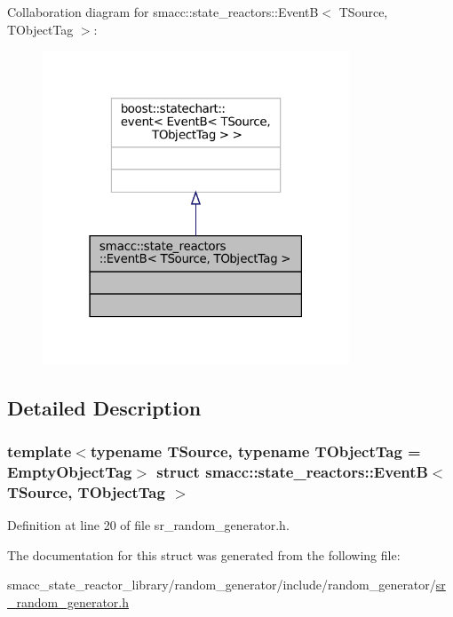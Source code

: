 Collaboration diagram for smacc\+:\+:state\+\_\+reactors\+:\+:EventB$<$ T\+Source, T\+Object\+Tag $>$\+:
\nopagebreak
\begin{figure}[H]
\begin{center}
\leavevmode
\includegraphics[width=259pt]{structsmacc_1_1state__reactors_1_1EventB__coll__graph}
\end{center}
\end{figure}


\subsection{Detailed Description}
\subsubsection*{template$<$typename T\+Source, typename T\+Object\+Tag = Empty\+Object\+Tag$>$\newline
struct smacc\+::state\+\_\+reactors\+::\+Event\+B$<$ T\+Source, T\+Object\+Tag $>$}



Definition at line 20 of file sr\+\_\+random\+\_\+generator.\+h.



The documentation for this struct was generated from the following file\+:\begin{DoxyCompactItemize}
\item 
smacc\+\_\+state\+\_\+reactor\+\_\+library/random\+\_\+generator/include/random\+\_\+generator/\hyperlink{sr__random__generator_8h}{sr\+\_\+random\+\_\+generator.\+h}\end{DoxyCompactItemize}
